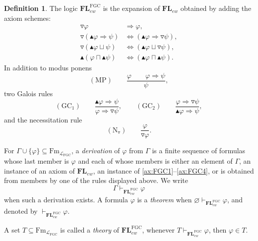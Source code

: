 \documentclass[final,12pt,times]{elsarticle}
\theoremstyle{plain}
\theoremstyle{definition}
\newtheorem{definition}{Definition}[section]
\theoremstyle{break}
\begin{document}
\begin{definition}\label{def:logic-FGC}
The logic $\mathbf{FL}^{\mathrm{FGC}}_{ew}$ is the expansion of
$\mathbf{FL}_{ew}$ obtained by adding the axiom schemes:
\begin{align}
 \triangledown\varphi&\Rightarrow\varphi,
   \tag{FGC1}\label{ax:FGC1}\\
 \triangledown(\blacktriangle\varphi\Rightarrow\psi)
   &\Leftrightarrow
   (\blacktriangle\varphi\Rightarrow\triangledown\psi),
   \tag{FGC2}\label{ax:FGC2}\\
 \triangledown(\blacktriangle\varphi\sqcup\psi)
   &\Leftrightarrow
   (\blacktriangle\varphi\sqcup\triangledown\psi),
   \tag{FGC3}\label{ax:FGC3}\\
 \blacktriangle(\varphi\sqcap\blacktriangle\psi)
   &\Leftrightarrow
   (\blacktriangle\varphi\sqcap\blacktriangle\psi).
   \tag{FGC4}\label{ax:FGC4}
\end{align}
In addition to modus ponens
\[
 (\mathrm{MP})\qquad
 \frac{\varphi\qquad\varphi\Rightarrow\psi}{\psi},
\]
two Galois rules
\[
 (\mathrm{GC}_1)\qquad
 \frac{\blacktriangle\varphi\Rightarrow\psi}
      {\varphi\Rightarrow\triangledown\psi},
 \qquad
 (\mathrm{GC}_2)\qquad
 \frac{\varphi\Rightarrow\triangledown\psi}
      {\blacktriangle\varphi\Rightarrow\psi},
\]
and the necessitation rule
\[
 (\mathrm N_{\triangledown})\qquad
 \frac{\varphi}{\triangledown\varphi}.
\]

For $\Gamma\cup\{\varphi\}\subseteq
\mathrm{Fm}_{\mathcal L_{\mathrm{FGC}}}$, a \emph{derivation} of $\varphi$ from
$\Gamma$ is a finite sequence of formulas whose last member is $\varphi$ and
each of whose members is either an element of $\Gamma$, an instance of an axiom
of $\mathbf{FL}_{ew}$, an instance of \eqref{ax:FGC1}--\eqref{ax:FGC4}, or is
obtained from members by one of the rules displayed above.  We write
\[
 \Gamma\vdash_{\mathbf{FL}^{\mathrm{FGC}}_{ew}}\varphi
\]
when such a derivation exists.  A formula $\varphi$ is a \emph{theorem} when
$\varnothing\vdash_{\mathbf{FL}^{\mathrm{FGC}}_{ew}}\varphi$, and denoted by
$\vdash_{\mathbf{FL}^{\mathrm{FGC}}_{ew}}\varphi$.
\end{definition}

A set $T\subseteq\mathrm{Fm}_{\mathcal L_{\mathrm{FGC}}}$ is called a
\emph{theory} of $\mathbf{FL}^{\mathrm{FGC}}_{ew}$, whenever $T\vdash_{\mathbf{FL}^{\mathrm{FGC}}_{ew}}\varphi$,
then $\varphi\in T$.
\end{document}
